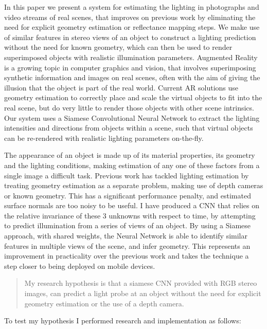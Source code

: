 \documentclass[ %
                    author={Gavin Parker},
                supervisor={Dr. Neill Campbell},
                    degree={MEng},
                     title={Deep Siamese Networks for Illumination Estimation from Stereo Images},
                  subtitle={},
                      type={research},
                      year={2018} ]{dissertation}
\begin{document}
\noindent
In this paper we present a system for estimating the lighting in photographs and video streams of real scenes, that improves on previous work by eliminating the need for explicit geometry estimation or reflectance mapping steps. We make use of similar features in stereo views of an object to construct a lighting prediction without the need for known geometry, which can then be used to render superimposed objects with realistic illumination parameters.
\newline
Augmented Reality is a growing topic in computer graphics and vision, that involves superimposing synthetic information and images on real scenes, often with the aim of giving the illusion that the object is part of the real world. Current AR solutions use geometry estimation to correctly place and scale the virtual objects to fit into the real scene, but do very little to render those objects with other scene intrinsics. Our system uses a Siamese Convolutional Neural Network to extract the lighting intensities and directions from objects within a scene, such that virtual objects can be re-rendered with realistic lighting parameters on-the-fly.

The appearance of an object is made up of its material properties, its geometry and the lighting conditions, making estimation of any one of these factors from a single image a difficult task. Previous work has tackled lighting estimation by treating geometry estimation as a separate problem, making use of depth cameras or known geometry. This has a significant performance penalty, and estimated surface normals are too noisy to be useful. I have produced a CNN that relies on the relative invariance of these 3 unknowns with respect to time, by attempting to predict illumination from a series of views of an object. By using a Siamese approach, with shared weights, the Neural Network is able to identify similar features  in multiple views of the scene, and infer geometry. This represents an improvement in practicality over the previous work and takes the technique a step closer to being deployed on mobile devices.

\begin{quote}
My research hypothesis is that a siamese CNN provided with RGB stereo images, can predict a light probe at an object without the need for explicit geometry estimation or the use of a depth camera.
\end{quote}

To test my hypothesis I performed research and implementation as follows:
\end{document}
